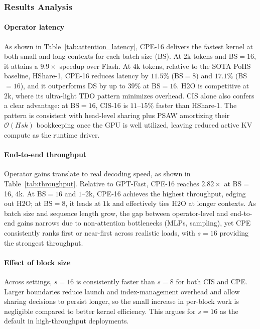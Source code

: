 \subsubsection{Results Analysis}

\paragraph{Operator latency} As shown in Table~\ref{tab:attention_latency}, CPE-16 delivers the fastest kernel at both small and long contexts for each batch size (BS). At $2\text{k}$ tokens and BS$=16$, it attains a $9.9\times$ speedup over Flash. At $4\text{k}$ tokens, relative to the SOTA PoHS baseline, HShare-1, CPE-16 reduces latency by $11.5\%$ (BS$=8$) and $17.1\%$ (BS$=16$), and it outperforms DS by up to $39\%$ at BS$=16$. H2O is competitive at $2\text{k}$, where its ultra-light TDO pattern minimizes overhead. CIS alone also confers a clear advantage: at BS$=16$, CIS-16 is $11$–$15\%$ faster than HShare-1. The pattern is consistent with head-level sharing plus PSAW amortizing their $\mathcal{O}(H s k)$ bookkeeping once the GPU is well utilized, leaving reduced active KV compute as the runtime driver.




\paragraph{End-to-end throughput} Operator gains translate to real decoding speed, as shown in Table~\ref{tab:throughput}. Relative to GPT-Fast, CPE-16 reaches $2.82\times$ at BS$=$16, $4\text{k}$. At BS$=16$ and $1$–$2\text{k}$, CPE-16 achieves the highest throughput, edging out H2O; at BS$=8$, it leads at $1\text{k}$ and effectively ties H2O at longer contexts. As batch size and sequence length grow, the gap between operator-level and end-to-end gains narrows due to non-attention bottlenecks (MLPs, sampling), yet CPE consistently ranks first or near-first across realistic loads, with $s{=}16$ providing the strongest throughput.


\paragraph{Effect of block size} Across settings, $s{=}16$ is consistently faster than $s{=}8$ for both CIS and CPE. Larger boundaries reduce launch and index-management overhead and allow sharing decisions to persist longer, so the small increase in per-block work is negligible compared to better kernel efficiency. This argues for $s{=}16$ as the default in high-throughput deployments.

